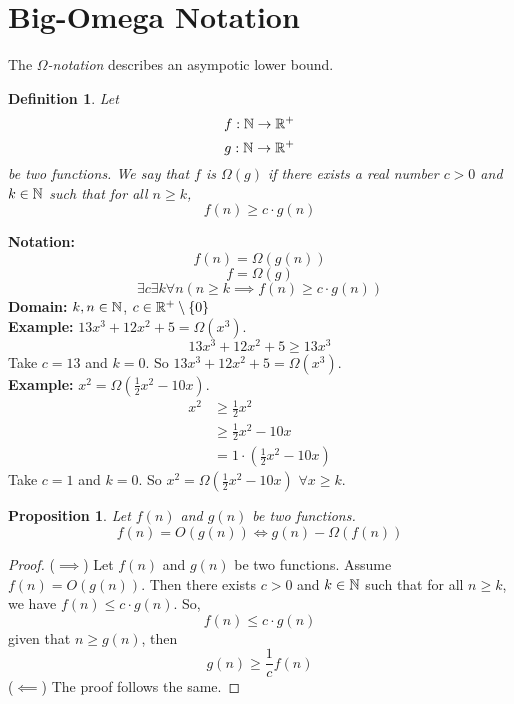 \documentclass[openany]{report}
\newtheorem{definition}{Definition}[section]
\newtheorem{prop}{Proposition}[section]
\begin{document}
\section{Big-Omega Notation}
The \emph{$\Omega$-notation} describes an asympotic lower bound.
\begin{definition}
    Let 
    \[f: \mathbb{N} \rightarrow \mathbb{R}^+\]
    \[g: \mathbb{N} \rightarrow \mathbb{R}^+\]
    be two functions. We say that $f$ is $\Omega(g)$ if there exists a real number $c > 0$ and $k \in \mathbb{N}$ such that for all $n \geq k$,
    \[f(n) \geq c\cdot g(n)\]
\end{definition}
\noindent
\textbf{Notation:} 
\[f(n) = \Omega(g(n))\]
\[f = \Omega(g)\]
\[\exists c\exists k \forall n (n \geq k \implies f(n) \geq c \cdot g(n))\]
\textbf{Domain:} $k, n \in \mathbb{N}$, $c \in \mathbb{R}^+ \setminus \{0\}$\\[3ex]
\textbf{Example:} $13x^3 + 12x^2 + 5 = \Omega(x^3)$.
\[13x^3 + 12x^2 + 5 \geq 13x^3\]
Take $c = 13$ and $k = 0$. So $13x^3 + 12x^2 + 5 = \Omega(x^3)$.\\[3ex]
\textbf{Example:} $x^2 = \Omega\left(\frac{1}{2}x^2 - 10x\right)$. 
\begin{align*}
    x^2 &\geq \frac{1}{2}x^2\\
    &\geq \frac{1}{2}x^2 - 10x\\
    &= 1 \cdot \left(\frac{1}{2}x^2 - 10x\right)
\end{align*}
Take $c = 1$ and $k = 0$. So $x^2 = \Omega\left(\frac{1}{2}x^2 - 10x\right)$ $\forall x \geq k$.
\begin{prop}
    Let $f(n)$ and $g(n)$ be two functions. 
    \[f(n) = O(g(n)) \iff g(n) - \Omega(f(n))\]
\end{prop}
\begin{proof}
    ($\implies$) Let $f(n)$ and $g(n)$ be two functions. Assume $f(n) = O(g(n))$. Then there exists $c > 0$ and $k \in \mathbb{N}$ such that for all $n \geq k$, we have $f(n) \leq c \cdot g(n)$. So,
    \[f(n) \leq c \cdot g(n)\]
    given that $n \geq g(n)$, then 
    \[g(n) \geq \frac{1}{c} f(n)\]
    ($\impliedby$) The proof follows the same.
\end{proof}
\end{document}
